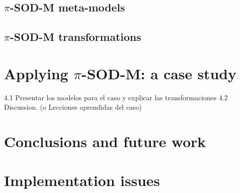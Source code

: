 \documentclass[preprint,12pt]{elsarticle}
\begin{document}
\subsection{$\pi$-SOD-M meta-models}\label{sec:pisodmmetamodels}


\subsection{$\pi$-SOD-M transformations}\label{sec:pisodmtransformations}



\section{Applying $\pi$-SOD-M: a case study}
4.1 Presentar los modelos para el caso y explicar las transformaciones
4.2 Discussion. (o Lecciones aprendidas del caso)




\section{Conclusions and future work}\label{sec:conclusions}



\appendix

\section{Implementation issues}\label{sec:implementation}





\end{document}
